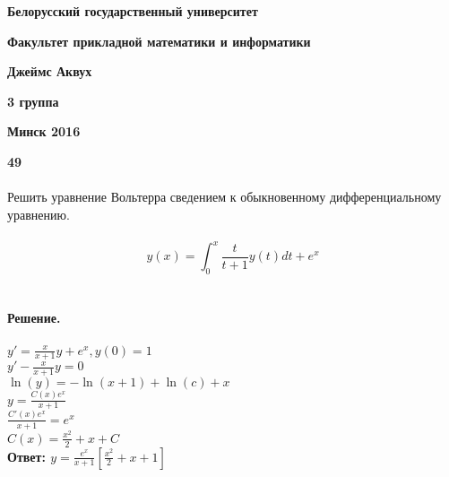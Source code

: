\documentclass[10pt,a4paper]{article}
\begin{document}
	\begin{titlepage}
		
		\centerline{\large \bf Белорусский государственный университет}
		\centerline{\large \bf Факультет прикладной математики и информатики}
		\vfill
		\vfill
		\vfill
		\vfill
		\vfill
		\vfill
		\centerline{\Large \bf Джеймс Аквух}
		\centerline{\Large \bf 3 группа}
		\bigskip
		\vfill
		\bigskip
		\vfill
		\vfill
		\vfill
		\hfill
		\vfill
		\vfill
		\centerline{\Large \bf Минск 2016}
	\end{titlepage}
	\noindent
	
	\noindent\textbf{49} \\ \\
	Решить уравнение Вольтерра сведением к обыкновенному дифференциальному уравнению.\\ \\
	$$y(x)=\int_0^x \frac{t}{t+1} y(t) dt + e^x$$ \\ \\
	\textbf{Решение.} \\ \\
	$y' = \frac{x}{x+1} y + e^x, y(0)=1$\\
	$y'-\frac{x}{x+1}y=0$\\
	$\ln(y)=-\ln(x+1)+\ln(c)+x$\\
	$y=\frac{C(x)e^x}{x+1}$\\
	$\frac{C'(x)e^x}{x+1}=e^x$\\
	$C(x)=\frac{x^2}{2}+x+C$\\
	\textbf{Ответ: $y=\frac{e^x}{x+1}[\frac{x^2}{2}+x+1]$} \\ \\
\end{document}
